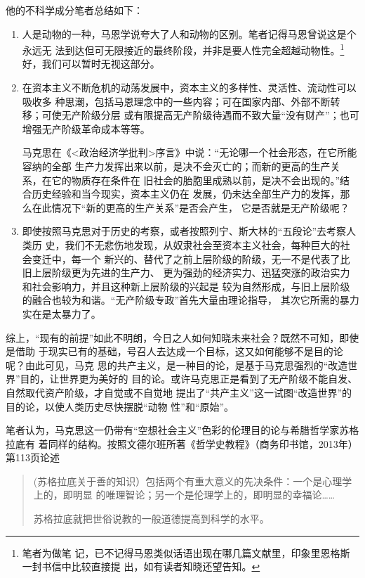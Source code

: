 他的不科学成分笔者总结如下：
\begin{enumerate}
\item 人是动物的一种，马恩学说夸大了人和动物的区别。笔者记得马恩曾说这是个永远无
  法到达但可无限接近的最终阶段，并非是要人性完全超越动物性。\footnote{笔者为做笔
    记，已不记得马恩类似话语出现在哪几篇文献里，印象里恩格斯一封书信中比较直接提
    出，如有读者知晓还望告知。}好，我们可以暂时无视这部分。

\item 在资本主义不断危机的动荡发展中，资本主义的多样性、灵活性、流动性可以吸收多
  种思潮，包括马恩理念中的一些内容；可在国家内部、外部不断转移；可使无产阶级分层
  或有限提高无产阶级待遇而不致大量``没有财产''；也可增强无产阶级革命成本等等。
  
  马克思在《<政治经济学批判>序言》中说：``无论哪一个社会形态，在它所能容纳的全部
  生产力发挥出来以前，是决不会灭亡的；而新的更高的生产关系，在它的物质存在条件在
  旧社会的胎胞里成熟以前，是决不会出现的。''结合历史经验和当今现实，资本主义仍在
  发展，仍未达全部生产力的发挥，那么在此情况下``新的更高的生产关系''是否会产生，
  它是否就是无产阶级呢？

\item 即使按照马克思对于历史的考察，或者按照列宁、斯大林的“五段论”去考察人类历
  史，我们不无悲伤地发现，从奴隶社会至资本主义社会，每种巨大的社会变迁中，每一个
  新兴的、替代了之前上层阶级的阶级，无一不是代表了比旧上层阶级更为先进的生产力、
  更为强劲的经济实力、迅猛突涨的政治实力和社会影响力，并且这种新上层阶级的兴起是
  较为自然形成，与旧上层阶级的融合也较为和谐。``无产阶级专政''首先大量由理论指导，
  其次它所需的暴力实在是太暴力了。
\end{enumerate}

综上，``现有的前提''如此不明朗，今日之人如何知晓未来社会？既然不可知，即使是借助
于现实已有的基础，号召人去达成一个目标，这又如何能够不是目的论呢？由此可见，马克
思的共产主义，是一种目的论，是基于马克思强烈的“改造世界”目的，让世界更为美好的
目的论。或许马克思正是看到了无产阶级不能自发、自然取代资产阶级，才自觉或不自觉地
提出了“共产主义”这一试图``改造世界''的目的论，以使人类历史尽快摆脱“动物
性”和“原始”。

笔者认为，马克思这一仍带有``空想社会主义''色彩的伦理目的论与希腊哲学家苏格拉底有
着同样的结构。按照文德尔班所著《哲学史教程》（商务印书馆，2013年）第113页论述
\begin{quotation}
  (苏格拉底关于善的知识）包括两个有重大意义的先决条件：一个是心理学上的，即明显
  的唯理智论；另一个是伦理学上的，即明显的幸福论……

  苏格拉底就把世俗说教的一般道德提高到科学的水平。
\end{quotation}

